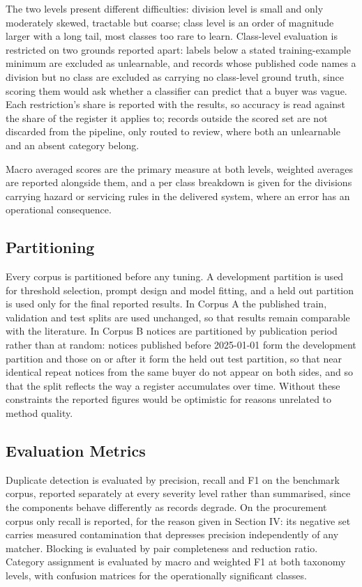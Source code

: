 \documentclass[conference]{IEEEtran}
\begin{document}
The two levels present different difficulties: division level is small
and only moderately skewed, tractable but coarse; class level is an
order of magnitude larger with a long tail, most classes too rare to
learn. Class-level evaluation is restricted on two grounds reported
apart: labels below a stated training-example minimum are excluded as
unlearnable, and records whose published code names a division but no
class are excluded as carrying no class-level ground truth, since
scoring them would ask whether a classifier can predict that a buyer
was vague. Each restriction's share is reported with the results, so
accuracy is read against the share of the register it applies to;
records outside the scored set are not discarded from the pipeline,
only routed to review, where both an unlearnable and an absent
category belong.

Macro averaged scores are the primary measure at both levels, weighted
averages are reported alongside them, and a per class breakdown is
given for the divisions carrying hazard or servicing rules in the
delivered system, where an error has an operational consequence.

\subsection{Partitioning}

Every corpus is partitioned before any tuning. A development partition
is used for threshold selection, prompt design and model fitting, and a
held out partition is used only for the final reported results. In
Corpus A the published train, validation and test splits are used
unchanged, so that results remain comparable with the literature. In
Corpus B notices are partitioned by publication period rather than at
random: notices published before 2025-01-01 form the development
partition and those on or after it form the held out test partition,
so that near identical repeat notices from the same buyer do not
appear on both sides, and so that the split reflects the way a register
accumulates over time. Without these constraints the
reported figures would be optimistic for reasons unrelated to method
quality.

\subsection{Evaluation Metrics}

Duplicate detection is evaluated by precision, recall and F1 on the
benchmark corpus, reported separately at every severity level rather than
summarised, since the components behave differently as records degrade.
On the procurement corpus only recall is reported, for the reason given
in Section IV: its negative set carries measured contamination that
depresses precision independently of any matcher. Blocking is evaluated
by pair completeness and reduction ratio. Category assignment is
evaluated by macro and weighted F1 at both taxonomy levels, with
confusion matrices for the operationally significant classes.
\end{document}
